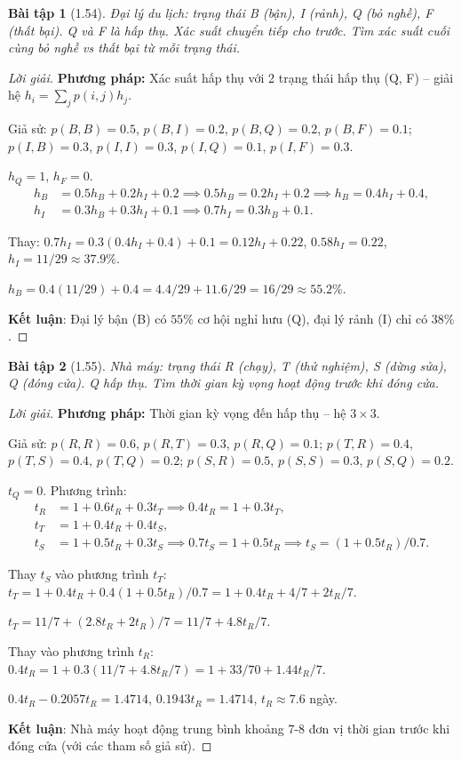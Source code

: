 \documentclass[8pt,a4paper]{article}
\newtheorem{exercise}{Bài tập}
\newenvironment{solution}{\begin{proof}[Lời giải]}{\end{proof}}
\begin{document}
\begin{exercise}[1.54]
Đại lý du lịch: trạng thái B (bận), I (rảnh), Q (bỏ nghề), F (thất bại). Q và F là hấp thụ. Xác suất chuyển tiếp cho trước. Tìm xác suất cuối cùng bỏ nghề vs thất bại từ mỗi trạng thái.
\end{exercise}
\begin{solution}
\textbf{Phương pháp:} Xác suất hấp thụ với 2 trạng thái hấp thụ (Q, F) -- giải hệ $h_i = \sum_j p(i,j) h_j$.

Giả sử: $p(B,B)=0.5$, $p(B,I)=0.2$, $p(B,Q)=0.2$, $p(B,F)=0.1$; $p(I,B)=0.3$, $p(I,I)=0.3$, $p(I,Q)=0.1$, $p(I,F)=0.3$.

$h_Q = 1$, $h_F = 0$.
\begin{align*}
  h_B &= 0.5 h_B + 0.2 h_I + 0.2 \implies 0.5 h_B = 0.2 h_I + 0.2 \implies h_B = 0.4 h_I + 0.4, \\
  h_I &= 0.3 h_B + 0.3 h_I + 0.1 \implies 0.7 h_I = 0.3 h_B + 0.1.
\end{align*}

Thay: $0.7 h_I = 0.3(0.4 h_I + 0.4) + 0.1 = 0.12 h_I + 0.22$, $0.58 h_I = 0.22$, $h_I = 11/29 \approx 37.9\%$.

$h_B = 0.4(11/29) + 0.4 = 4.4/29 + 11.6/29 = 16/29 \approx 55.2\%$.

\textbf{Kết luận}: Đại lý bận (B) có $55\%$ cơ hội nghỉ hưu (Q), đại lý rảnh (I) chỉ có $38\%$.
\end{solution}

\begin{exercise}[1.55]
Nhà máy: trạng thái R (chạy), T (thử nghiệm), S (dừng sửa), Q (đóng cửa). Q hấp thụ. Tìm thời gian kỳ vọng hoạt động trước khi đóng cửa.
\end{exercise}
\begin{solution}
\textbf{Phương pháp:} Thời gian kỳ vọng đến hấp thụ -- hệ $3\times 3$.

Giả sử: $p(R,R)=0.6$, $p(R,T)=0.3$, $p(R,Q)=0.1$; $p(T,R)=0.4$, $p(T,S)=0.4$, $p(T,Q)=0.2$; $p(S,R)=0.5$, $p(S,S)=0.3$, $p(S,Q)=0.2$.

$t_Q = 0$. Phương trình:
\begin{align*}
  t_R &= 1 + 0.6 t_R + 0.3 t_T \implies 0.4 t_R = 1 + 0.3 t_T, \\
  t_T &= 1 + 0.4 t_R + 0.4 t_S, \\
  t_S &= 1 + 0.5 t_R + 0.3 t_S \implies 0.7 t_S = 1 + 0.5 t_R \implies t_S = (1 + 0.5 t_R)/0.7.
\end{align*}

Thay $t_S$ vào phương trình $t_T$: $t_T = 1 + 0.4 t_R + 0.4(1 + 0.5 t_R)/0.7 = 1 + 0.4 t_R + 4/7 + 2t_R/7$.

$t_T = 11/7 + (2.8t_R + 2t_R)/7 = 11/7 + 4.8t_R/7$.

Thay vào phương trình $t_R$: $0.4 t_R = 1 + 0.3(11/7 + 4.8t_R/7) = 1 + 33/70 + 1.44t_R/7$.

$0.4 t_R - 0.2057 t_R = 1.4714$, $0.1943 t_R = 1.4714$, $t_R \approx 7.6$ ngày.

\textbf{Kết luận}: Nhà máy hoạt động trung bình khoảng 7-8 đơn vị thời gian trước khi đóng cửa (với các tham số giả sử).
\end{solution}
\end{document}
